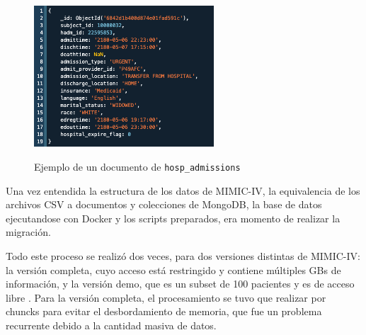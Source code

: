 \begin{figure}[H]
  \centering
  {\includegraphics[width=0.6\textwidth]{imagenes/ej_admission.png}}
  \caption{Ejemplo de un documento de \texttt{hosp\_admissions}}
  \label{fig:screenshot3}
\end{figure}

Una vez entendida la estructura de los datos de MIMIC-IV, la equivalencia de los archivos CSV a documentos y colecciones de MongoDB, la base de datos ejecutandose con Docker y los scripts preparados, era momento de realizar la migración. 

Todo este proceso se realizó dos veces, para dos versiones distintas de MIMIC-IV: la versión completa, cuyo acceso está restringido y contiene múltiples GBs de información, y la versión demo, que es un subset de 100 pacientes y es de acceso libre \cite{MIMICIV_Demo}. Para la versión completa, el procesamiento se tuvo que realizar por chuncks para evitar el desbordamiento de memoria, que fue un problema recurrente debido a la cantidad masiva de datos.

